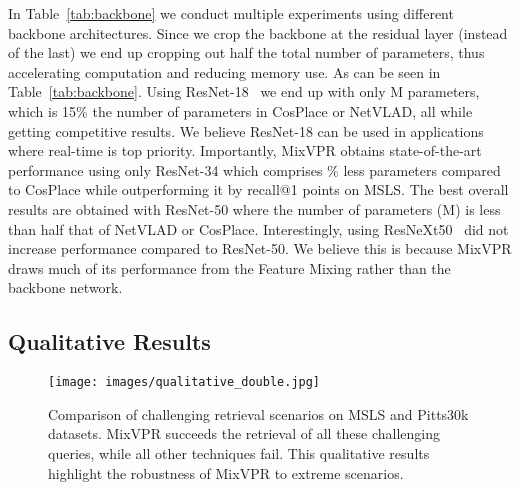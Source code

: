 \documentclass[10pt,twocolumn,letterpaper]{article}
\begin{document}
In Table~\ref{tab:backbone} we conduct multiple experiments using different backbone architectures. Since we crop the backbone at the  residual layer (instead of the last) we end up cropping out half the total number of parameters, thus accelerating computation and reducing memory use. As can be seen in Table~\ref{tab:backbone}. Using ResNet-18~\cite{he2016deep} we end up with only M parameters, which is 15\% the number of parameters in CosPlace or NetVLAD, all while getting competitive results. We believe ResNet-18 can be used in applications where real-time is top priority. Importantly, MixVPR obtains state-of-the-art performance using only ResNet-34 which comprises \% less parameters compared to CosPlace while outperforming it by  recall@1 points on MSLS. The best overall results are obtained with ResNet-50 where the number of parameters (M) is less than half that of NetVLAD or CosPlace. Interestingly, using ResNeXt50~\cite{xie2017aggregated} did not increase performance compared to ResNet-50. We believe this is because MixVPR  draws much of its performance from the Feature Mixing rather than the backbone network.

\subsection{Qualitative Results}
\begin{figure*}
\begin{center}
\texttt{[image: images/qualitative\_double.jpg]}
\end{center}
   \caption{Comparison of challenging retrieval scenarios on MSLS and Pitts30k datasets. MixVPR succeeds the retrieval of all these challenging queries, while all other techniques fail. This qualitative results highlight the robustness of MixVPR to extreme scenarios.}
\label{fig:fails}
\end{figure*}
\end{document}
